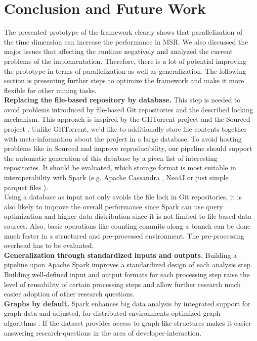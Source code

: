 
\section{Conclusion and Future Work}
\label{conclusion}
The presented prototype of the \iris framework clearly shows that parallelization of the time dimension can increase the performance in MSR. We also discussed the major issues that affecting the runtime negatively and analyzed the current problems of the implementation. Therefore, there is a lot of potential improving the prototype in terms of parallelization as well as generalization. The following section is presenting further steps to optimize the framework and make it more flexible for other mining tasks.\\
\textbf{Replacing the file-based repository by database.}
This step is needed to avoid problems introduced by file-based Git repositories and the described locking mechanism. This approach is inspired by the GHTorrent project \cite{Gousios2012, Gousios2015} and the Sourced project \cite{Markovtsev2018}. Unlike GHTorrent, we'd like to additionally store file contents together with meta-information about the project in a large database. To avoid hosting problems like in Sourced and improve reproducibility, our pipeline should support the automatic generation of this database by a given list of interesting repositories. It should be evaluated, which storage format is most suitable in interoperability with Spark (e.g. Apache Cassandra \cite{lakshman2010cassandra}, Neo4J \cite{neo4j} or just simple parquet files \cite{parquet}).\\
Using a database as input not only avoids the file lock in Git repositories, it is also likely to improve the overall performance since Spark can use query optimization and higher data distribution since it is not limited to file-based data sources. Also, basic operations like counting commits along a branch can be done much faster in a structured and pre-processed environment. The pre-processing overhead has to be evaluated.\\
\textbf{Generalization through standardized inputs and outputs.} Building a pipeline upon Apache Spark improves a standardized design of each analysis step. Building well-defined input and output formats for each processing step raise the level of reusability of certain processing steps and allow further research much easier adoption of other research questions.\\
\textbf{Graphs by default.} Spark enhances big data analysis by integrated support for graph data and adjusted, for distributed environments optimized graph algorithms \cite{graphx}. If the dataset provides access to graph-like structures makes it easier answering research-questions in the area of developer-interaction.\\
